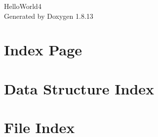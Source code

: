 \documentclass[twoside]{book}
\newcommand{\+}{\discretionary{\mbox{\scriptsize$\hookleftarrow$}}{}{}}
\newcommand{\clearemptydoublepage}{%
  \newpage{\pagestyle{empty}\cleardoublepage}%
}
\begin{document}
\hypersetup{pageanchor=false,
             bookmarksnumbered=true,
             pdfencoding=unicode
            }
\begin{titlepage}
\vspace*{7cm}
\begin{center}%
{\Large Hello\+World4 }\\
\vspace*{1cm}
{\large Generated by Doxygen 1.8.13}\\
\end{center}
\end{titlepage}
\clearemptydoublepage
{}
\tableofcontents
\clearemptydoublepage
{}
\hypersetup{pageanchor=true}

\chapter{Index Page}
\label{index}\hypertarget{index}{}
\chapter{Data Structure Index}

\chapter{File Index}

\end{document}
